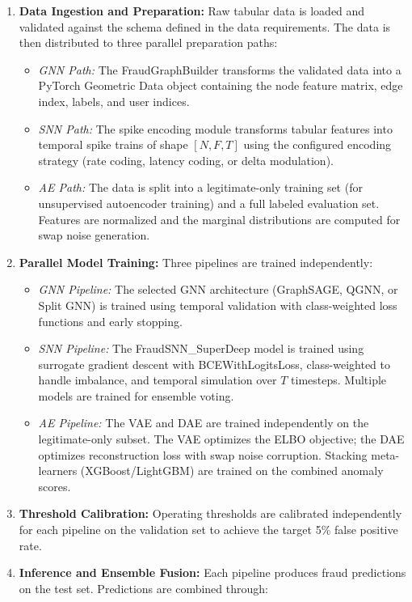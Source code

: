 \begin{enumerate}[label=\arabic*.]
\item \textbf{Data Ingestion and Preparation:} Raw tabular data is loaded and validated against the schema defined in the data requirements. The data is then distributed to three parallel preparation paths:
\begin{itemize}
\item \textit{GNN Path:} The FraudGraphBuilder transforms the validated data into a PyTorch Geometric Data object containing the node feature matrix, edge index, labels, and user indices.
\item \textit{SNN Path:} The spike encoding module transforms tabular features into temporal spike trains of shape $[N, F, T]$ using the configured encoding strategy (rate coding, latency coding, or delta modulation).
\item \textit{AE Path:} The data is split into a legitimate-only training set (for unsupervised autoencoder training) and a full labeled evaluation set. Features are normalized and the marginal distributions are computed for swap noise generation.
\end{itemize}
\item \textbf{Parallel Model Training:} Three pipelines are trained independently:
\begin{itemize}
\item \textit{GNN Pipeline:} The selected GNN architecture (GraphSAGE, QGNN, or Split GNN) is trained using temporal validation with class-weighted loss functions and early stopping.
\item \textit{SNN Pipeline:} The FraudSNN\_SuperDeep model is trained using surrogate gradient descent with BCEWithLogitsLoss, class-weighted to handle imbalance, and temporal simulation over $T$ timesteps. Multiple models are trained for ensemble voting.
\item \textit{AE Pipeline:} The VAE and DAE are trained independently on the legitimate-only subset. The VAE optimizes the ELBO objective; the DAE optimizes reconstruction loss with swap noise corruption. Stacking meta-learners (XGBoost/LightGBM) are trained on the combined anomaly scores.
\end{itemize}
\item \textbf{Threshold Calibration:} Operating thresholds are calibrated independently for each pipeline on the validation set to achieve the target 5\% false positive rate.
\item \textbf{Inference and Ensemble Fusion:} Each pipeline produces fraud predictions on the test set. Predictions are combined through:

\end{enumerate}
